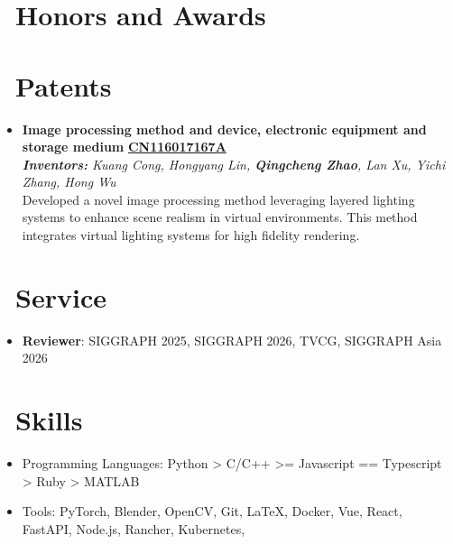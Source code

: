 \documentclass{resume}
\begin{document}
\section{\faTrophy\ Honors and Awards}


\section{\faGavel\ Patents}

\begin{itemize}
  \item \textbf{Image processing method and device, electronic equipment and storage medium} \hfill \textbf{\href{https://worldwide.espacenet.com/publicationDetails/biblio?CC=CN&NR=116017167A&KC=A&FT=D}{CN116017167A}}\\
        \textit{\small \textbf{Inventors:} Kuang Cong, Hongyang Lin, \textbf{Qingcheng Zhao}, Lan Xu, Yichi Zhang, Hong Wu} \\
        Developed a novel image processing method leveraging layered lighting systems to enhance scene realism in virtual environments. This method integrates virtual lighting systems for high fidelity rendering.
\end{itemize}

\section{\faEdit\ Service}

\begin{itemize}
  \item \textbf{Reviewer}: SIGGRAPH 2025, SIGGRAPH 2026, TVCG, SIGGRAPH Asia 2026
\end{itemize}

\section{\faCogs\ Skills}
\begin{itemize}[parsep=0.5ex]
  \item Programming Languages: Python > C/C++ >= Javascript == Typescript > Ruby > MATLAB
  \item Tools: PyTorch, Blender, OpenCV, Git, \LaTeX, Docker, Vue, React, FastAPI, Node.js, Rancher, Kubernetes,
\end{itemize}


% 
\end{document}

